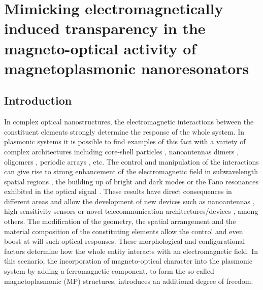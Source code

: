 \chapter{Mimicking electromagnetically induced transparency in the magneto-optical activity of magnetoplasmonic nanoresonators \label{chap3}}

\section{Introduction}

In complex optical nanostructures, the electromagnetic interactions between the constituent elements strongly determine the response of the whole system. In plasmonic systems it is possible to find examples of this fact with a variety of complex architectures including core-shell particles \cite{prodan2003hybridization}, nanoantennas \cite{muhlschlegel2005resonant,fromm2004gap, ghenuche2008spectroscopic} dimers \cite{su2003interparticle, Rechberger_2003, dmitriev2007gold, wadell2012optical, brown2010heterodimers}, oligomers \cite{hentschel2010transition, lassiter2010fano}, periodic arrays \cite{zou2004silver, auguie2008collective}, etc. The control and manipulation of the interactions can give rise to strong enhancement of the electromagnetic field in subwavelength spatial regions \cite{aizpurua2005optical, sundaramurthy2005field}, the building up of bright and dark modes \cite{dolling2005cut, verellen2009fano, yang2011fano} or the Fano resonances exhibited in the optical signal \cite{luk2010fano, francescato2012plasmonic, gallinet2011influence}. These results have direct consequences in different areas and allow the development of new devices such as nanoantennas \cite{cubukcu2008plasmonic}, high sensitivity sensors \cite{cetin2012fano, anker2008biosensing} or novel telecommunication architectures/devices \cite{schuller2010plasmonics}, among others. The modification of the geometry, the spatial arrangement and the material composition of the constituting elements allow the control and even boost at will such optical responses. These morphological and configurational factors determine how the whole entity interacts with an electromagnetic field. In this scenario, the incorporation of magneto-optical character into the plasmonic system by adding a ferromagnetic component, to form the so-called magnetoplasmonic (MP) structures, introduces an additional degree of freedom. 
